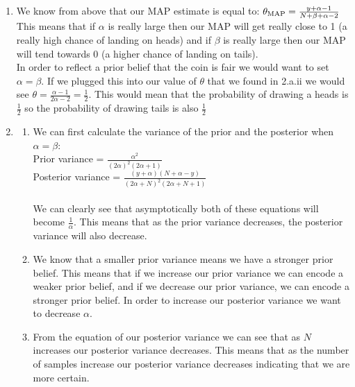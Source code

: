 \documentclass[submit]{harvardml}
\begin{document}
\begin{enumerate}
        \begin{enumerate}
            \item We know from above that our MAP estimate is equal to: $\theta_{\textnormal{MAP}} = \frac{y+\alpha -1}{N+\beta + \alpha -2}$\\
            This means that if $\alpha$ is really large then our MAP will get really close to 1 (a really high chance of landing on heads) and if $\beta$ is really large then our MAP will tend towards 0 (a higher chance of landing on tails). \\In order to reflect a prior belief that the coin is fair we would want to set $\alpha = \beta$. If we plugged this into our value of $\theta$ that we found in 2.a.ii we would see $\theta = \frac{\alpha-1}{2\alpha-2} = \frac{1}{2}$. This would mean that the probability of drawing a heads is $\frac{1}{2}$ so the probability of drawing tails is also $\frac{1}{2}$\\
            \item
            \begin{enumerate}
                \item 
                We can first calculate the variance of the prior and the posterior when $\alpha = \beta$:\\
            Prior variance = $\frac{\alpha^2}{(2\alpha)^2(2\alpha + 1)}$\\
            Posterior variance = $\frac{(y+\alpha)(N+\alpha -y)}{(2\alpha+N)^2(2\alpha + N + 1)}$\\
            \\
            We can clearly see that asymptotically both of these equations will become $\frac{1}{\alpha}$. This means that as the prior variance decreases, the posterior variance will also decrease.\\
            \item
            We know that a smaller prior variance means we have a stronger prior belief. This means that if we increase our prior variance we can encode a weaker prior belief, and if we decrease our prior variance, we can encode a stronger prior belief. In order to increase our posterior variance we want to decrease $\alpha$.\\
            \item 
            From the equation of our posterior variance we can see that as $N$ increases our posterior variance decreases. This means that as the number of samples increase our posterior variance decreases indicating that we are more certain.\\
            \end{enumerate}
            

\end{enumerate}
\end{enumerate}
\end{document}
